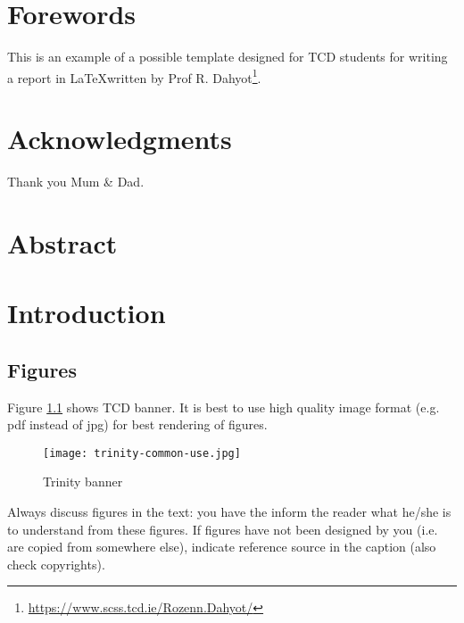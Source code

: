 \documentclass[english,a4paper,11pt,oneside,onecolumn]{book}
\begin{document}
\chapter*{Forewords}

This is an example  of a possible  template designed for TCD students for writing a report in \LaTeX written by  Prof R. Dahyot\footnote{\url{https://www.scss.tcd.ie/Rozenn.Dahyot/}}. 

\chapter*{Acknowledgments}

Thank you Mum \& Dad.

\chapter*{Abstract}

\tableofcontents

\listoffigures

\listoftables


%

\chapter{Introduction} 

\section{Figures}
Figure \ref{fig:tcd}  shows TCD banner. It is best to use high quality image format (e.g. pdf instead of jpg) for best rendering of figures. 
\begin{figure}[!h]
\begin{center}
\texttt{[image: trinity-common-use.jpg]}
\caption{Trinity banner}\label{fig:tcd}
\end{center}
\end{figure}

Always discuss figures in the text: you have the inform the reader what he/she is to understand from these figures. 
If figures have not been designed by you (i.e. are copied from somewhere else), indicate reference source in the caption (also check copyrights).
\end{document}

